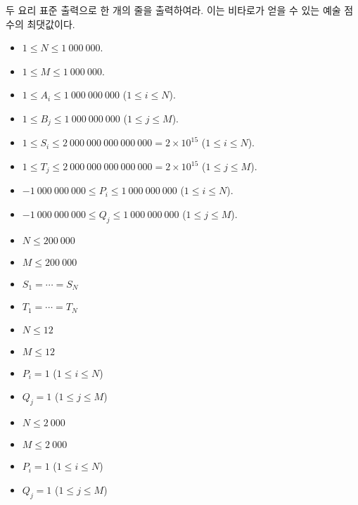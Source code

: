 \begin{problem}{두 요리}
	표준 출력으로 한 개의 줄을 출력하여라. 이는 비타로가 얻을 수 있는 예술 점수의 최댓값이다.
		
	\Constraints
	
	\begin{itemize}
		\item $1 \le N \le 1\ 000\ 000$.
		\item $1 \le M \le 1\ 000\ 000$.
		\item $1 \le A_i \le 1\ 000\ 000\ 000$ ($1 \le i \le N$).
		\item $1 \le B_j \le 1\ 000\ 000\ 000$ ($1 \le j \le M$).
		\item $1 \le S_i \le 2\ 000\ 000\ 000\ 000\ 000 = 2 \times 10^{15}$ ($1 \le i \le N$).
		\item $1 \le T_j \le 2\ 000\ 000\ 000\ 000\ 000 = 2 \times 10^{15}$ ($1 \le j \le M$).
		\item $-1\ 000\ 000\ 000 \le P_i \le 1\ 000\ 000\ 000$ ($1 \le i \le N$).
		\item $-1\ 000\ 000\ 000 \le Q_j \le 1\ 000\ 000\ 000$ ($1 \le j \le M$).
	\end{itemize}
	
	
	\begin{itemize}
		\item $N \le 200\ 000$
		\item $M \le 200\ 000$
		\item $S_1 = \cdots = S_N$
		\item $T_1 = \cdots = T_N$
	\end{itemize}


	\begin{itemize}
		\item $N \le 12$
		\item $M \le 12$
		\item $P_i = 1$ ($1 \le i \le N$)
		\item $Q_j = 1$ ($1 \le j \le M$)
	\end{itemize}



	\begin{itemize}
		\item $N \le 2\ 000$
		\item $M \le 2\ 000$
		\item $P_i = 1$ ($1 \le i \le N$)
		\item $Q_j = 1$ ($1 \le j \le M$)
	\end{itemize}




\end{problem}
